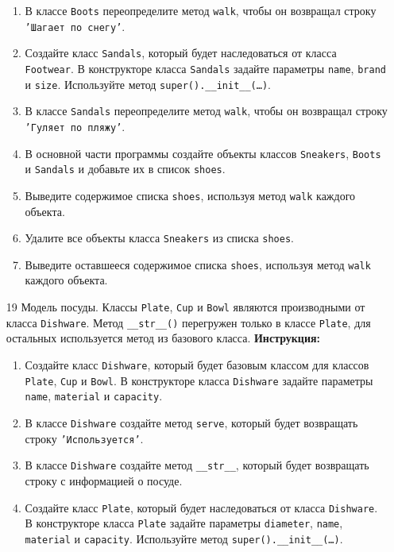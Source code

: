 \begin{enumerate}
\begin{enumerate}
    \item В классе \texttt{Boots} переопределите метод \texttt{walk}, чтобы он возвращал строку \texttt{'Шагает по снегу'}.
    \item Создайте класс \texttt{Sandals}, который будет наследоваться от класса \texttt{Footwear}. В конструкторе класса \texttt{Sandals} задайте параметры \texttt{name}, \texttt{brand} и \texttt{size}. Используйте метод \texttt{super().\_\_init\_\_(\ldots)}.
    \item В классе \texttt{Sandals} переопределите метод \texttt{walk}, чтобы он возвращал строку \texttt{'Гуляет по пляжу'}.
    \item В основной части программы создайте объекты классов \texttt{Sneakers}, \texttt{Boots} и \texttt{Sandals} и добавьте их в список \texttt{shoes}.
    \item Выведите содержимое списка \texttt{shoes}, используя метод \texttt{walk} каждого объекта.
    \item Удалите все объекты класса \texttt{Sneakers} из списка \texttt{shoes}.
    \item Выведите оставшееся содержимое списка \texttt{shoes}, используя метод \texttt{walk} каждого объекта.
\end{enumerate}
\item[19]
Модель посуды. Классы \texttt{Plate}, \texttt{Cup} и \texttt{Bowl} являются производными от класса \texttt{Dishware}. Метод \texttt{\_\_str\_\_()} перегружен только в классе \texttt{Plate}, для остальных используется метод из базового класса.
\textbf{Инструкция:}
\begin{enumerate}
    \item Создайте класс \texttt{Dishware}, который будет базовым классом для классов \texttt{Plate}, \texttt{Cup} и \texttt{Bowl}. В конструкторе класса \texttt{Dishware} задайте параметры \texttt{name}, \texttt{material} и \texttt{capacity}.
    \item В классе \texttt{Dishware} создайте метод \texttt{serve}, который будет возвращать строку \texttt{'Используется'}.
    \item В классе \texttt{Dishware} создайте метод \texttt{\_\_str\_\_}, который будет возвращать строку с информацией о посуде.
    \item Создайте класс \texttt{Plate}, который будет наследоваться от класса \texttt{Dishware}. В конструкторе класса \texttt{Plate} задайте параметры \texttt{diameter}, \texttt{name}, \texttt{material} и \texttt{capacity}. Используйте метод \texttt{super().\_\_init\_\_(\ldots)}.

\end{enumerate}
\end{enumerate}
